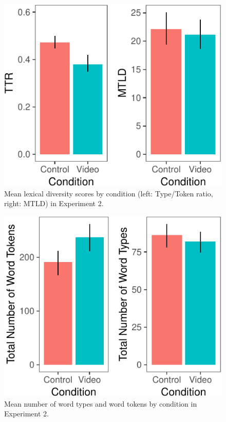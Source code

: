 \documentclass[10pt, letterpaper]{article}
\newenvironment{CodeChunk}{}{}
\begin{document}
\begin{CodeChunk}
\begin{figure}[H]

{\centering \includegraphics{figs/e2lexdiv-1} 

}

\caption[Mean lexical diversity scores by condition (left]{Mean lexical diversity scores by condition (left: Type/Token ratio, right: MTLD) in Experiment 2.}\label{fig:e2lexdiv}
\end{figure}
\end{CodeChunk}

\begin{CodeChunk}
\begin{figure}[H]

{\centering \includegraphics{figs/e2token-type-1} 

}

\caption[Mean number of word types and word tokens by condition in Experiment 2]{Mean number of word types and word tokens by condition in Experiment 2.}\label{fig:e2token-type}
\end{figure}
\end{CodeChunk}
\end{document}
